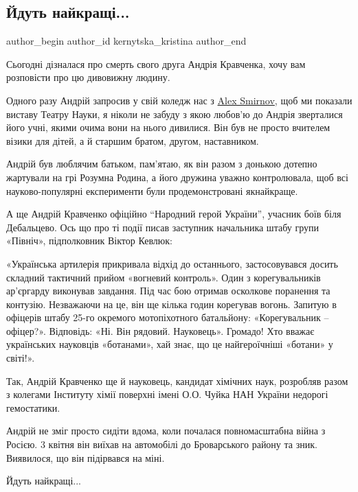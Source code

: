  
 
 
 
 
 
\subsection{Йдуть найкращі...}
\label{sec:15_04_2022.fb.kernytska_kristina.1.jdyt_najkraschi}
 
\ifcmt
 author_begin
   author_id kernytska_kristina
 author_end
\fi

Сьогодні дізналася про смерть свого друга Андрія Кравченка, хочу вам розповісти
про цю дивовижну людину.

Одного разу Андрій запросив у свій коледж нас з
\href{https://www.facebook.com/alex.smirnov.5201}{Alex Smirnov}, щоб ми
показали виставу Театру Науки, я ніколи не забуду з якою любов'ю до Андрія
зверталися його учні, якими очима вони на нього дивилися. Він був не просто
вчителем візики для дітей, а й старшим братом, другом, наставником.


Андрій був люблячим батьком, пам'ятаю, як він разом з донькою дотепно жартували
на грі Розумна Родина, а його дружина уважно контролювала, щоб всі
науково-популярні експерименти були продемонстровані якнайкраще.

А ще Андрій Кравченко офіційно \enquote{Народний герой України}, учасник боїв біля
Дебальцево. Ось що про ті події писав заступник начальника штабу групи
«Північ», підполковник Віктор Кевлюк:

«Українська артилерія прикривала відхід до останнього, застосовувався досить
складний тактичний прийом «вогневий контроль». Один з корегувальників
ар’єргарду виконував завдання. Під час бою отримав осколкове поранення та
контузію. Незважаючи на це, він ще кілька годин корегував вогонь. Запитую в
офіцерів штабу 25-го окремого мотопіхотного батальйону: «Корегувальник –
офіцер?». Відповідь: «Ні. Він рядовий. Науковець». Громадо! Хто вважає
українських науковців «ботанами», хай знає, що це найгероїчніші «ботани» у
світі!».


Так, Андрій Кравченко ще й науковець, кандидат хімічних наук, розробляв разом з
колегами Інституту хімії поверхні імені О.О. Чуйка НАН України недорогі
гемостатики.

Андрій не зміг просто сидіти вдома, коли почалася повномасштабна війна з
Росією. 3 квітня він виїхав на автомобілі до Броварського району та зник.
Виявилося, що він підірвався на міні. 

Йдуть найкращі...
